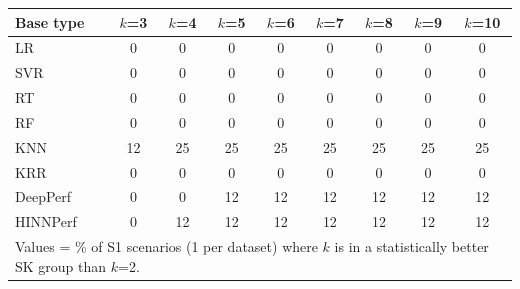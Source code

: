 \begin{tabular}{lcccccccc}
\toprule
Base type & $k$=3 & $k$=4 & $k$=5 & $k$=6 & $k$=7 & $k$=8 & $k$=9 & $k$=10 \\
\midrule
LR & 0 & 0 & 0 & 0 & 0 & 0 & 0 & 0 \\
SVR & 0 & 0 & 0 & 0 & 0 & 0 & 0 & 0 \\
RT & 0 & 0 & 0 & 0 & 0 & 0 & 0 & 0 \\
RF & 0 & 0 & 0 & 0 & 0 & 0 & 0 & 0 \\
KNN & 12 & 25 & 25 & 25 & 25 & 25 & 25 & 25 \\
KRR & 0 & 0 & 0 & 0 & 0 & 0 & 0 & 0 \\
DeepPerf & 0 & 0 & 12 & 12 & 12 & 12 & 12 & 12 \\
HINNPerf & 0 & 12 & 12 & 12 & 12 & 12 & 12 & 12 \\
\bottomrule
\multicolumn{9}{l}{\footnotesize Values = \% of S1 scenarios (1 per dataset) where $k$ is in a statistically better SK group than $k$=2.}} \\
\end{tabular}
